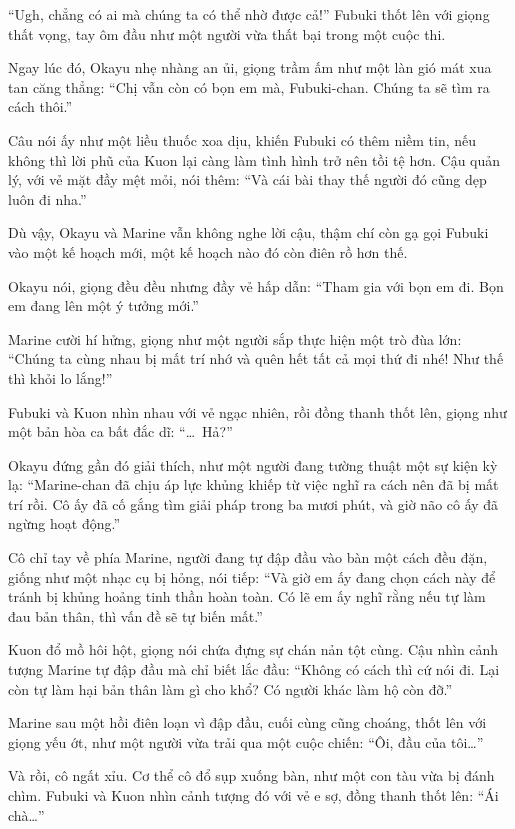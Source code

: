 \documentclass[../main.tex]{subfiles}
\begin{document}
``Ugh, chẳng có ai mà chúng ta có thể nhờ được cả!'' Fubuki thốt lên với giọng thất vọng, tay ôm đầu như một người vừa thất bại trong một cuộc thi.

Ngay lúc đó, Okayu nhẹ nhàng an ủi, giọng trầm ấm như một làn gió mát xua tan căng thẳng: ``Chị vẫn còn có bọn em mà, Fubuki-chan. Chúng ta sẽ tìm ra cách thôi.''

Câu nói ấy như một liều thuốc xoa dịu, khiến Fubuki có thêm niềm tin, nếu không thì lời phũ của Kuon lại càng làm tình hình trở nên tồi tệ hơn. Cậu quản lý, với vẻ mặt đầy mệt mỏi, nói thêm: ``Và cái bài thay thế người đó cũng dẹp luôn đi nha.''

Dù vậy, Okayu và Marine vẫn không nghe lời cậu, thậm chí còn gạ gọi Fubuki vào một kế hoạch mới, một kế hoạch nào đó còn điên rồ hơn thế.

Okayu nói, giọng đều đều nhưng đầy vẻ hấp dẫn: ``Tham gia với bọn em đi. Bọn em đang lên một ý tưởng mới.''

Marine cười hí hửng, giọng như một người sắp thực hiện một trò đùa lớn: ``Chúng ta cùng nhau bị mất trí nhớ và quên hết tất cả mọi thứ đi nhé! Như thế thì khỏi lo lắng!''

Fubuki và Kuon nhìn nhau với vẻ ngạc nhiên, rồi đồng thanh thốt lên, giọng như một bản hòa ca bất đắc dĩ: ``\dots\ Hả?''

Okayu đứng gần đó giải thích, như một người đang tường thuật một sự kiện kỳ lạ: ``Marine-chan đã chịu áp lực khủng khiếp từ việc nghĩ ra cách nên đã bị mất trí rồi. Cô ấy đã cố gắng tìm giải pháp trong ba mươi phút, và giờ não cô ấy đã ngừng hoạt động.''

Cô chỉ tay về phía Marine, người đang tự đập đầu vào bàn một cách đều đặn, giống như một nhạc cụ bị hỏng, nói tiếp: ``Và giờ em ấy đang chọn cách này để tránh bị khủng hoảng tinh thần hoàn toàn. Có lẽ em ấy nghĩ rằng nếu tự làm đau bản thân, thì vấn đề sẽ tự biến mất.''


Kuon đổ mồ hôi hột, giọng nói chứa đựng sự chán nản tột cùng. Cậu nhìn cảnh tượng Marine tự đập đầu mà chỉ biết lắc đầu: ``Không có cách thì cứ nói đi. Lại còn tự làm hại bản thân làm gì cho khổ? Có người khác làm hộ còn đỡ.''

Marine sau một hồi điên loạn vì đập đầu, cuối cùng cũng choáng, thốt lên với giọng yếu ớt, như một người vừa trải qua một cuộc chiến: ``Ôi, đầu của tôi\dots''

Và rồi, cô ngất xỉu. Cơ thể cô đổ sụp xuống bàn, như một con tàu vừa bị đánh chìm. Fubuki và Kuon nhìn cảnh tượng đó với vẻ e sợ, đồng thanh thốt lên: ``Ái chà\dots''
\end{document}
